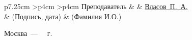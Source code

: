 \begin{titlepage}
\begin{table}[h!]
        \vspace{\baselineskip}

        \begin{signstabular}[0.7]{p{7.25cm} >{\centering\arraybackslash}p{4cm} >{\centering\arraybackslash}p{4cm}}
			Преподаватель  & \uline{\mbox{\hspace*{4cm}}} & \uline{\hfill Власов~П.~А. \hfill} \\
			& \scriptsize (Подпись, дата) & \scriptsize (Фамилия И.О.)
		\end{signstabular}

		\vspace{\baselineskip}
    \end{table}

    \begin{center}
		\vfill
		Москва~---~\the\year
		~г.
	\end{center}
	\restoregeometry
\end{titlepage}
